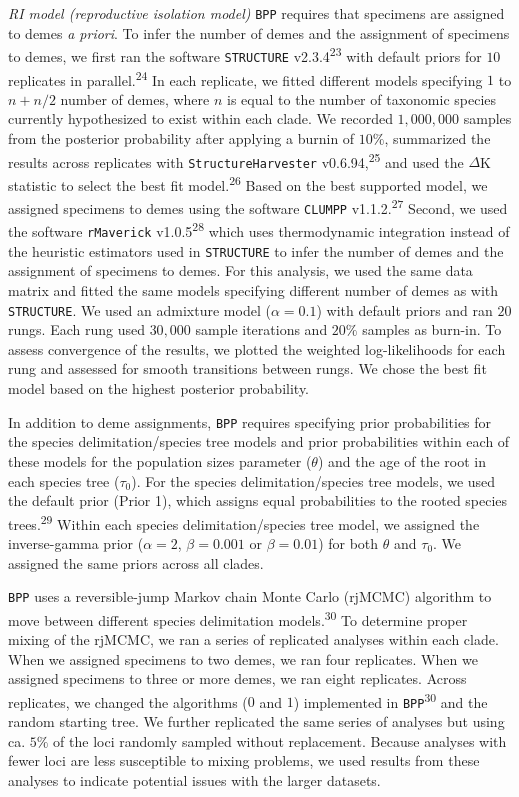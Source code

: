 \documentclass[
  11pt,
]{article}
\begin{document}
\emph{RI model (reproductive isolation model)} \texttt{BPP} requires that specimens are assigned to demes \emph{a priori}. To infer the number of demes and the assignment of specimens to demes, we first ran the software \texttt{STRUCTURE} v2.3.4\textsuperscript{23} with default priors for \(10\) replicates in parallel.\textsuperscript{24} In each replicate, we fitted different models specifying \(1\) to \(n + n/2\) number of demes, where \(n\) is equal to the number of taxonomic species currently hypothesized to exist within each clade. We recorded \(1,000,000\) samples from the posterior probability after applying a burnin of \(10\%\), summarized the results across replicates with \texttt{StructureHarvester} v0.6.94,\textsuperscript{25} and used the \(\Delta\)K statistic to select the best fit model.\textsuperscript{26} Based on the best supported model, we assigned specimens to demes using the software \texttt{CLUMPP} v1.1.2.\textsuperscript{27} Second, we used the software \texttt{rMaverick} v1.0.5\textsuperscript{28} which uses thermodynamic integration instead of the heuristic estimators used in \texttt{STRUCTURE} to infer the number of demes and the assignment of specimens to demes. For this analysis, we used the same data matrix and fitted the same models specifying different number of demes as with \texttt{STRUCTURE}. We used an admixture model (\(\alpha=0.1\)) with default priors and ran \(20\) rungs. Each rung used \(30,000\) sample iterations and \(20\%\) samples as burn-in. To assess convergence of the results, we plotted the weighted log-likelihoods for each rung and assessed for smooth transitions between rungs. We chose the best fit model based on the highest posterior probability.

In addition to deme assignments, \texttt{BPP} requires specifying prior probabilities for the species delimitation/species tree models and prior probabilities within each of these models for the population sizes parameter (\(\theta\)) and the age of the root in each species tree (\(\tau_0\)). For the species delimitation/species tree models, we used the default prior (Prior 1), which assigns equal probabilities to the rooted species trees.\textsuperscript{29} Within each species delimitation/species tree model, we assigned the inverse-gamma prior (\(\alpha=2\), \(\beta=0.001\) or \(\beta=0.01\)) for both \(\theta\) and \(\tau_0\). We assigned the same priors across all clades.

\texttt{BPP} uses a reversible-jump Markov chain Monte Carlo (rjMCMC) algorithm to move between different species delimitation models.\textsuperscript{30} To determine proper mixing of the rjMCMC, we ran a series of replicated analyses within each clade. When we assigned specimens to two demes, we ran four replicates. When we assigned specimens to three or more demes, we ran eight replicates. Across replicates, we changed the algorithms (\(0\) and \(1\)) implemented in \texttt{BPP}\textsuperscript{30} and the random starting tree. We further replicated the same series of analyses but using ca. \(5\%\) of the loci randomly sampled without replacement. Because analyses with fewer loci are less susceptible to mixing problems, we used results from these analyses to indicate potential issues with the larger datasets.
\end{document}
